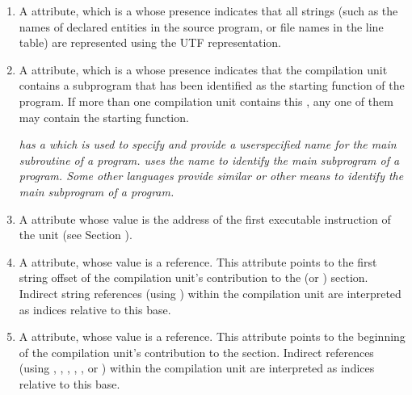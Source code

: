\begin{enumerate}[1. ]
\item A \DWATuseUTFeight{} attribute,
which is a  whose
presence indicates that all strings (such as the names of
declared entities in the source program, or file names in the line table) 
are represented using the UTF representation. 

\item A \DWATmainsubprogram{} attribute, which is a 
whose presence indicates 
\hypertarget{chap:DWATmainsubprogramunitcontainingmainorstartingsubprogram}{}
that the compilation unit contains a
subprogram that has been identified as the starting function
of the program. If more than one compilation unit contains
this , any one of them may contain the starting function.

\textit{ has a 
which is used
to specify and provide a user\dash specified name for the main
subroutine of a program. 
 uses the name  to identify
the main subprogram of a program. Some other languages provide
similar or other means to identify the main subprogram of
a program.}

\item A \DWATentrypc{} attribute whose value is the address of the first
\hypertarget{chap:DWATentrypcofcompileunit}{}
\hypertarget{chap:DWATentrypcofpartialunit}{}
executable instruction of the unit (see 
Section ).

\item A \DWATstroffsetsbaseNAME{}
\hypertarget{chap:DWATstroffsetbaseforindirectstringtable}{} 
attribute, whose value is a reference. 
This attribute points to the first string
offset of the compilation unit's contribution to the
\dotdebugstroffsets{} (or \dotdebugstroffsetsdwo{}) section. 
Indirect string references
(using \DWFORMstrx) within the compilation unit are
interpreted as indices relative to this base.

\item A \DWATaddrbaseNAME{}
\hypertarget{chap:DWATaddrbaseforaddresstable}{}
attribute, whose value is a reference.
This attribute points to the beginning of the compilation
unit's contribution to the \dotdebugaddr{} section.
Indirect references (using \DWFORMaddrx, \DWOPaddrx, 
\DWOPconstx, \DWLLEbaseaddressselectionentry{}, 
\DWLLEstartendentry, or \DWLLEstartlengthentry) within the compilation unit are
interpreted as indices relative to this base.


\end{enumerate}
